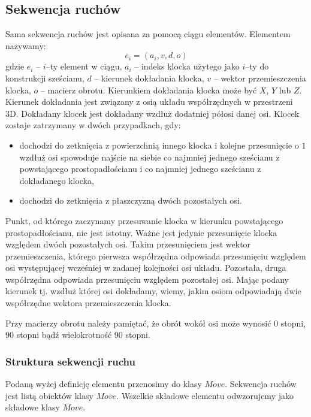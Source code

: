 \documentclass[12pt]{article}
\begin{document}
\subsection{Sekwencja ruchów}
Sama sekwencja ruchów jest opisana za pomocą ciągu elementów. Elementem
nazywamy:
\begin{equation}
	e_i = (a_i,v,d,o)
\end{equation}
gdzie
$e_i$ -- $i$--ty element w ciągu,
$a_i$ -- indeks klocka użytego jako $i$--ty do konstrukcji sześcianu,
$d$ -- kierunek dokładania klocka,
$v$ -- wektor przemieszczenia klocka,
$o$ -- macierz obrotu.
Kierunkiem dokładania klocka może być $X$, $Y$ lub $Z$. Kierunek dokładania
jest związany z osią układu współrzędnych w przestrzeni 3D. Dokładany
klocek jest dokładany wzdłuż dodatniej półosi danej osi. Klocek zostaje
zatrzymany w dwóch przypadkach, gdy:
\begin{itemize}
	\item dochodzi do zetknięcia z powierzchnią innego klocka i kolejne
		przesunięcie o $1$ wzdłuż osi spowoduje najście na siebie co najmniej 
		jednego sześcianu z powstającego prostopadłościanu i co najmniej
		jednego sześcianu z dokładanego klocka,
	\item dochodzi do zetknięcia z płaszczyzną dwóch pozostałych osi.
\end{itemize}
Punkt, od którego zaczynamy przesuwanie klocka w kierunku powstającego
prostopadłościanu, nie jest istotny. Ważne jest jedynie przesunięcie
klocka względem dwóch pozostałych osi. Takim przesunięciem jest wektor
przemieszczenia, którego pierwsza współrzędna odpowiada przesunięciu
względem osi występującej wcześniej w zadanej kolejności osi układu.
Pozostała, druga współrzędna odpowiada przesunięciu względem pozostałej
osi. Mając podany kierunek tj. wzdłuż której osi dokładamy, wiemy,
jakim osiom odpowiadają dwie współrzędne wektora przemieszczenia klocka.

Przy macierzy obrotu należy pamiętać, że obrót wokół osi może wynosić
0 stopni, 90 stopni bądź wielokrotność 90 stopni.

\subsubsection{Struktura sekwencji ruchu}
Podaną wyżej definicję elementu przenosimy do klasy $Move$. Sekwencja
ruchów jest listą obiektów klasy $Move$. Wszelkie składowe elementu
odwzorujemy jako składowe klasy $Move$.
\end{document}
